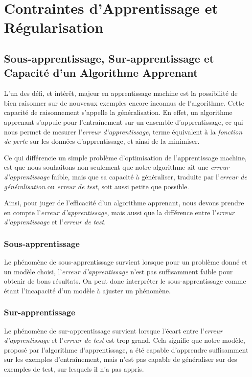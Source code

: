 \documentclass[a4paper, 10pt]{report}
\begin{document}
\section{Contraintes d'Apprentissage et Régularisation}
\subsection{Sous-apprentissage, Sur-apprentissage et Capacité d'un Algorithme Apprenant}
L'un des défi, et intérêt, majeur en apprentissage machine est la possibilité de bien raisonner sur de nouveaux exemples encore inconnus de l'algorithme. Cette capacité de raisonnement s'appelle la généralisation.
En effet, un algorithme apprenant s'appuie pour l'entraînement sur un ensemble d'apprentissage, ce qui nous permet de mesurer l'\emph{erreur d'apprentissage}, terme équivalent à la \emph{fonction de perte} sur les données d'apprentissage, et ainsi de la minimiser.

Ce qui différencie un simple problème d'optimisation de l'apprentissage machine, est que nous souhaitons non seulement que notre algorithme ait une \emph{erreur d’apprentissage} faible, mais que sa capacité à généraliser, traduite par l'\emph{erreur de généralisation} ou \emph{erreur de test}, soit aussi petite que possible.

Ainsi, pour juger de l'efficacité d'un algorithme apprenant, nous devons prendre en compte l'\emph{erreur d'apprentissage}, mais aussi que la différence entre l'\emph{erreur d'apprentissage} et l'\emph{erreur de test}.
\subsubsection{Sous-apprentissage}
Le phénomène de sous-apprentissage survient lorsque pour un problème donné et un modèle choisi, l'\emph{erreur d'apprentissage} n'est pas suffisamment faible pour obtenir de bons résultats.
On peut donc interpréter le sous-apprentissage comme étant l'incapacité d'un modèle à ajuster un phénomène.
\subsubsection{Sur-apprentissage}
Le phénomène de sur-apprentissage survient lorsque l'écart entre l'\emph{erreur d'apprentissage} et l'\emph{erreur de test} est trop grand. Cela signifie que notre modèle, proposé par l'algorithme d'apprentissage, a été capable d'apprendre suffisamment sur les exemples d'entraînement, mais n'est pas capable de généraliser sur des exemples de test, sur lesquels il n'a pas appris.
\end{document}
